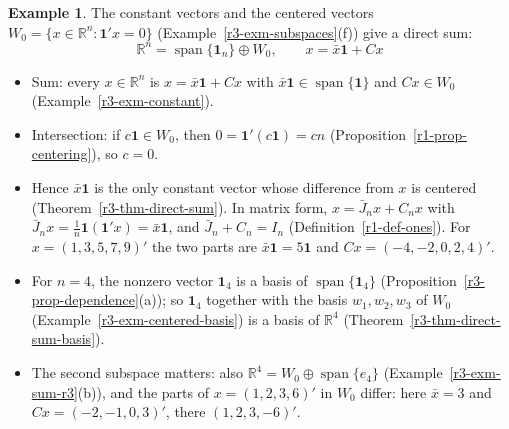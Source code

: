 \documentclass[12pt]{article}
\newcommand{\R}{\mathbb R}
\newcommand{\one}{\mathbf 1}
\DeclareMathOperator{\Span}{span}
\theoremstyle{definition}
\newtheorem{example}[theorem]{Example}
\begin{document}
\begin{example}\label{r3-exm-constant-centered}
The constant vectors and the centered vectors \(W_0=\{x\in\R^n:\one'x=0\}\)
(Example~\ref{r3-exm-subspaces}(f)) give a direct sum:
\[
\R^n=\Span\{\one_n\}\oplus W_0,\qquad x=\bar x\one+Cx
\]
\begin{itemize}
\item Sum: every \(x\in\R^n\) is \(x=\bar x\one+Cx\) with \(\bar x\one\in\Span\{\one\}\) and
\(Cx\in W_0\) (Example~\ref{r3-exm-constant}).
\item Intersection: if \(c\one\in W_0\), then \(0=\one'(c\one)=cn\)
(Proposition~\ref{r1-prop-centering}), so \(c=0\).
\item Hence \(\bar x\one\) is the only constant vector whose difference from \(x\) is centered
(Theorem~\ref{r3-thm-direct-sum}). In matrix form, \(x=\bar J_nx+C_nx\) with
\(\bar J_nx=\frac1n\one(\one'x)=\bar x\one\), and \(\bar J_n+C_n=I_n\)
(Definition~\ref{r1-def-ones}). For \(x=(1,3,5,7,9)'\) the two parts are \(\bar x\one=5\one\)
and \(Cx=(-4,-2,0,2,4)'\).
\item For \(n=4\), the nonzero vector \(\one_4\) is a basis of \(\Span\{\one_4\}\)
(Proposition~\ref{r3-prop-dependence}(a)); so \(\one_4\) together with the basis \(w_1,w_2,w_3\) of \(W_0\)
(Example~\ref{r3-exm-centered-basis}) is a basis of \(\R^4\) (Theorem~\ref{r3-thm-direct-sum-basis}).
\item The second subspace matters: also \(\R^4=W_0\oplus\Span\{e_4\}\)
(Example~\ref{r3-exm-sum-r3}(b)), and the parts of \(x=(1,2,3,6)'\) in \(W_0\) differ: here
\(\bar x=3\) and \(Cx=(-2,-1,0,3)'\), there \((1,2,3,-6)'\).
\end{itemize}
\end{example}
\end{document}
